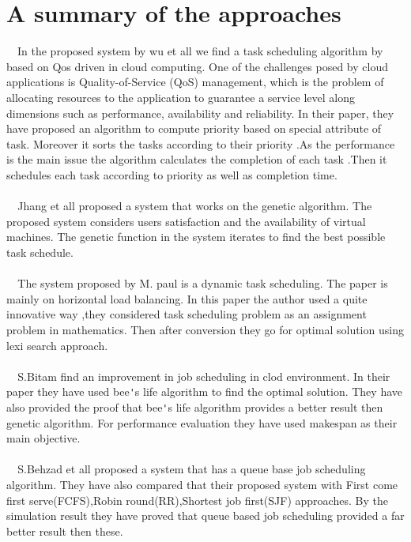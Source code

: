\documentclass[10pt]{report}
\begin{document}
\chapter{A summary of the approaches}
~~In the proposed system by wu et all  we find a task scheduling algorithm by based on Qos driven in cloud computing. One of the challenges posed by cloud applications is Quality-of-Service (QoS) management, which is the problem of allocating resources to the application to guarantee a service level along dimensions such as performance, availability and reliability. In their paper, they have proposed an algorithm to compute priority based on special attribute of task. Moreover it sorts the tasks according to their priority .As the performance is the main issue the algorithm calculates the completion of each task .Then it schedules each task according to priority as well as completion time.\cite{Wu}\\\\
\verb|  |Jhang et all proposed a system that works on the  genetic algorithm. The proposed system  considers users satisfaction and the availability of virtual machines. The genetic function in the system iterates to find the best possible task schedule.\cite{Jhang}\\\\
\verb|  |The system proposed by M. paul is a dynamic task scheduling. The paper is mainly on horizontal load balancing. In this paper the author used a quite innovative way ,they considered task scheduling problem as an assignment problem in mathematics. Then after conversion they go for optimal solution using lexi search approach.\cite{Paul}\\\\
\verb|  |S.Bitam find an improvement in job scheduling in clod environment. In their paper they have used bee\verb|'|s life algorithm to find the optimal solution. They have also provided the proof that bee\verb|'|s life algorithm provides a better result then genetic algorithm. For performance evaluation they have used makespan as their main objective.\cite{Bitam}\\\\
\verb|  |S.Behzad et all proposed a system that has a queue base job scheduling algorithm. They have also compared that their proposed system  with First come first serve(FCFS),Robin round(RR),Shortest job first(SJF) approaches. By the simulation result they have proved that queue based job scheduling provided a far better result then these.\cite{Behzad} \\\\
\end{document}
